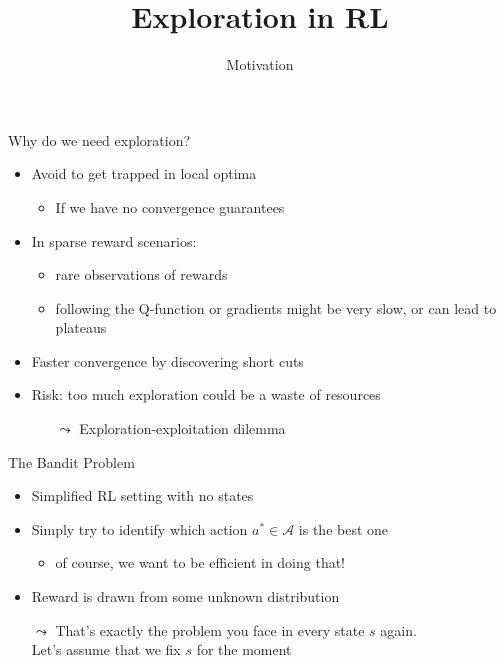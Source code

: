 


\title[Reinforcement Learning: Big Picture]{Exploration in RL}
\subtitle{Motivation}




	
	\maketitle

\begin{frame}[c]{Why do we need exploration?}

\begin{itemize}
	\item Avoid to get trapped in local optima 
	\begin{itemize}
		\item If we have no convergence guarantees
	\end{itemize}
	\item In sparse reward scenarios:
	\begin{itemize}
		\item rare observations of rewards
		\item following the Q-function or gradients might be very slow, or can lead to plateaus 
	\end{itemize}
	\item Faster convergence by discovering short cuts
	\bigskip
	\pause
	\item \alert{Risk:} too much exploration could be a waste of resources
	\begin{itemize}
		\item[$\leadsto$] Exploration-exploitation dilemma
	\end{itemize}
\end{itemize}

\end{frame}
\begin{frame}[c]{The Bandit Problem}

\begin{itemize}
	\item Simplified RL setting with no states
	\item Simply try to identify which action $a^* \in \mathcal{A}$ is the best one
	\begin{itemize}
		\item of course, we want to be efficient in doing that!
	\end{itemize}
	\item Reward is drawn from some unknown distribution
	\bigskip
	\pause
	\item[$\leadsto$] That's exactly the problem you face in every state $s$ again.\\ Let's assume that we fix $s$ for the moment
\end{itemize}

\end{frame}
